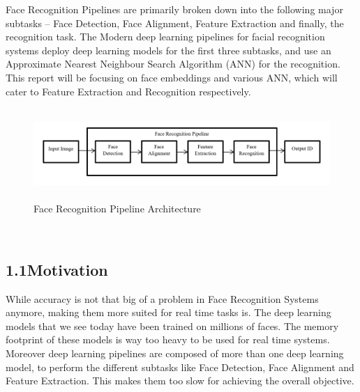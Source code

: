 \documentclass[12pt]{article}
\renewcommand{\_}{\kern-1.5pt\textunderscore\kern-1.5pt}
\begin{document}
\setlength{\parskip}{12.0pt}
\begin{justify}
Face Recognition Pipelines are primarily broken down into the following major subtasks – Face Detection, Face Alignment, Feature Extraction and finally, the recognition task. The Modern deep learning pipelines for facial recognition systems deploy deep learning models for the first three subtasks, and use an Approximate Nearest Neighbour Search Algorithm (ANN) for the recognition. This report will be focusing on face embeddings and various ANN, which will cater to Feature Extraction and Recognition respectively.
\end{justify}\par

\begin{justify}



\begin{figure}[H]
	\begin{FlushLeft}		\includegraphics[width=6.27in,height=1.36in]{./media/image6.png}
		\caption{Face Recognition Pipeline Architecture}
		\label{fig:Face_Recognition_Pipeline_Architecture}
	\end{FlushLeft}\end{figure}



\\

\end{justify}\par

\setlength{\parskip}{6.0pt}
\subsection*{1.1\hspace*{10pt}Motivation}
\begin{justify}
While accuracy is not that big of a problem in Face Recognition Systems anymore, making them more suited for real time tasks is. The deep learning models that we see today have been trained on millions of faces. The memory footprint of these models is way too heavy to be used for real time systems. Moreover deep learning pipelines are composed of more than one deep learning model, to perform the different subtasks like Face Detection, Face Alignment and Feature Extraction. This makes them too slow for achieving the overall objective. 
\end{justify}\par
\end{document}
